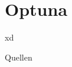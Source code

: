 \documentclass{beamer}
\begin{document}
\begin{frame}
  \titlepage
\end{frame}

\setcounter{section}{28}
\section{Optuna}

\begin{frame}
  xd
\end{frame}

\begin{frame}{Quellen}
  \sloppy
  \printbibliography
\end{frame}
\end{document}
